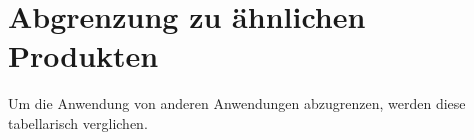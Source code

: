 
\section{Abgrenzung zu ähnlichen Produkten}\label{sec:abgrenzung-zu-ahnlichen-produkten}
Um die Anwendung von anderen Anwendungen abzugrenzen, werden diese tabellarisch verglichen.
\newline
\newline
